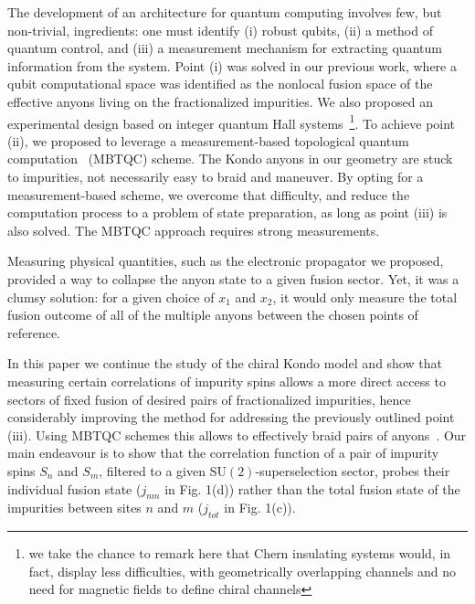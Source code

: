 \documentclass[aps,prb,twocolumn,superscriptaddress]{revtex4-1}
\begin{document}
The development of an architecture for quantum computing involves few, but non-trivial, ingredients: one must identify (i) robust qubits, (ii) a method of quantum control, and (iii) a measurement mechanism for extracting quantum information from the system. Point (i) was solved in our previous work, where a qubit computational space was identified as the nonlocal fusion space of the effective anyons living on the fractionalized impurities. We also proposed an experimental design based on integer quantum Hall systems~\footnote{we take the chance to remark here that Chern insulating systems would, in fact, display less difficulties, with geometrically overlapping channels and no need for magnetic fields to define chiral channels}. To achieve point (ii), we proposed to leverage a measurement-based topological quantum computation~\cite{nayak2008non,bonderson2008measurement,kitaev2006anyons,bonderson2012non} (MBTQC) scheme. The Kondo anyons in our geometry are stuck to impurities, not necessarily easy to braid and maneuver. By opting for a measurement-based scheme, we overcome that difficulty, and reduce the computation process to a problem of state preparation, as long as point (iii) is also solved. The MBTQC approach requires strong measurements. 

Measuring physical quantities, such as the electronic propagator we proposed, provided a way to collapse the anyon state to a given fusion sector. Yet, it was a clumsy solution: for a given choice of $x_1$ and $x_2$, it would only measure the total fusion outcome of all of the multiple anyons between the chosen points of reference.

In this paper we continue the study of the chiral Kondo model and show that measuring certain correlations of impurity spins allows a more direct access to sectors of fixed fusion of desired pairs of fractionalized impurities, hence considerably improving the method for addressing the previously outlined point (iii). Using MBTQC schemes this allows to effectively braid pairs of anyons~\cite{nayak2008non,bonderson2008measurement,kitaev2006anyons,bonderson2012non}.
Our main endeavour is to show that the correlation function of a pair of impurity spins $S_{n}$ and $S_{m}$, filtered to a given SU$(2)$-superselection sector, probes their individual fusion state ($j_{nm}$ in Fig. 1(d)) rather than the total fusion state of the impurities between sites $n$ and $m$ ($j_{tot}$ in Fig. 1(c)). 
\end{document}
